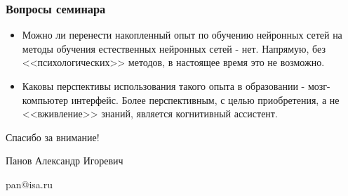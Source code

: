 \documentclass[default]{beamer}
\begin{document}
	\begin{frame}
		\frametitle{Вопросы семинара}
		
		\begin{itemize}
			\item Можно ли перенести накопленный опыт по обучению нейронных сетей на методы обучения естественных нейронных сетей - {\color{red} нет}. Напрямую, без <<психологических>> методов, в настоящее время это не возможно.
			\item Каковы перспективы использования такого опыта в образовании - {\color{red} мозг-компьютер интерфейс}. Более перспективным, с целью приобретения, а не <<вживление>> знаний, является когнитивный ассистент.
		\end{itemize}
	\end{frame}
	\begin{frame}
		\centering
		\Huge
		Спасибо за внимание!
		\normalsize
		\par\bigskip
		\par\bigskip
		\par\bigskip
		Панов Александр Игоревич
		
		pan@isa.ru
	\end{frame}			
\end{document}
